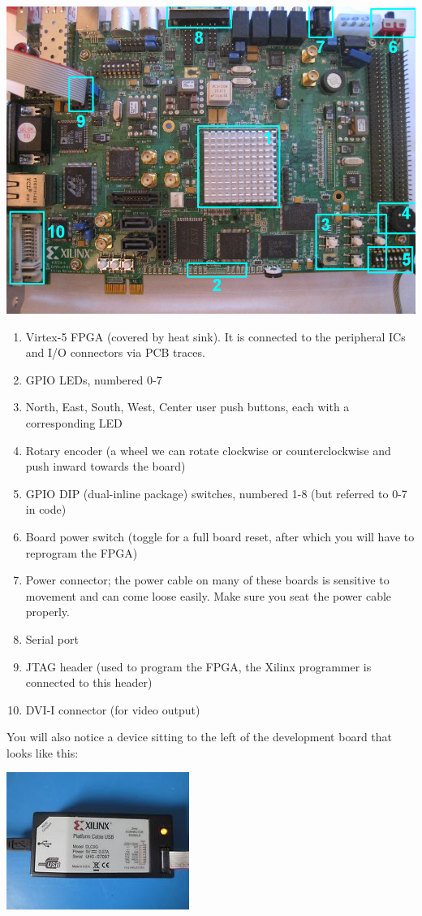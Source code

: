 \documentclass[11pt]{article}
\begin{document}
\includegraphics[width=\textwidth]{images/dev_board.png}
\begin{enumerate}
	\item Virtex-5 FPGA (covered by heat sink). It is connected to the peripheral ICs and I/O connectors via PCB traces.
	\item GPIO LEDs, numbered 0-7
	\item North, East, South, West, Center user push buttons, each with a corresponding LED
	\item Rotary encoder (a wheel we can rotate clockwise or counterclockwise and push inward towards the board)
	\item GPIO DIP (dual-inline package) switches, numbered 1-8 (but referred to 0-7 in code)
	\item Board power switch (toggle for a full board reset, after which you will have to reprogram the FPGA)
	\item Power connector; the power cable on many of these boards is sensitive to movement and can come loose easily. Make sure you seat the power cable properly.
	\item Serial port
	\item JTAG header (used to program the FPGA, the Xilinx programmer is connected to this header)
	\item DVI-I connector (for video output)
\end{enumerate}

You will also notice a device sitting to the left of the development board that looks like this:

\begin{center}
	\includegraphics{images/xilinx_platform_cable.jpg}
\end{center}
\end{document}
